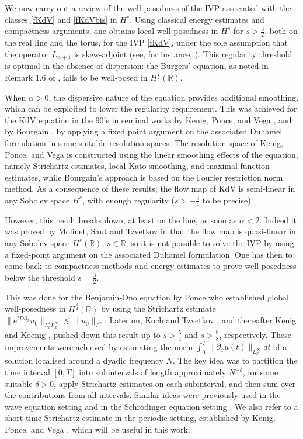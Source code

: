 \documentclass{amsart}
\theoremstyle{definition}
\theoremstyle{remark}
\numberwithin{equation}{section}
\begin{document}
We now carry out a review of the well-posedness of the IVP associated with the classes \eqref{fKdV} and \eqref{fKdVbis} in $H^s$. Using classical energy estimates and compactness arguments, one obtains local well-posedness in $H^s$ for $s > \frac{3}{2}$, both on the real line and the torus, for the IVP \eqref{fKdV}, under the sole assumption that the operator $L_{\alpha+1}$ is skew-adjoint (see, for instance, \cite{ABFS89}). This regularity threshold is optimal in the absence of dispersion: the Burgers' equation, as noted in Remark 1.6 of \cite{LiPiSa14}, fails to be well-posed in $H^{\frac32}(\mathbb R)$. 

When $\alpha > 0$, the dispersive nature of the equation provides additional smoothing, which can be exploited to lower the regularity requirement. This was achieved for the KdV equation in the 90's in seminal works by Kenig, Ponce, and Vega \cite{KPV93,KPV96}, and by Bourgain \cite{Bo93}, by applying a fixed point argument on the associated Duhamel formulation in some suitable resolution spaces. The resolution space of Kenig, Ponce, and Vega is constructed using the linear smoothing effects of the equation, namely Strichartz estimates, local Kato smoothing, and maximal function estimates, while Bourgain's approach is based on the Fourier restriction norm method. As a consequence of these results, the flow map of KdV is semi-linear in any Sobolev space $H^s$, with enough regularity ($s>-\frac34$ to be precise). 

However, this result breaks down, at least on the line, as soon as $\alpha<2$. Indeed it was proved by Molinet, Saut and Tzvetkov in \cite{MoSaTz01} that the flow map is quasi-linear in any Sobolev space $H^s(\mathbb R)$, $s\in \mathbb R$, so it is not possible to solve the IVP by using a fixed-point argument on the associated Duhamel formulation. One has then to come back to compactness methods and energy estimates to prove well-posedness below the threshold $s=\frac32$.

This was done for the Benjamin-Ono equation by Ponce \cite{Po91} who established global well-posedness in $H^\frac32(\mathbb R)$ by using the Strichartz estimate $\|e^{tD\partial_x}u_0\|_{L^4_tL^{\infty}_x} \lesssim \|u_0\|_{L^2}$. Later on, Koch and Tzvetkov \cite{KoTz03}, and thereafter Kenig and Koenig \cite{KK03}, pushed down this result up to $s>\frac54$ and $s>\frac98$, respectively. These improvements were achieved by estimating the norm $\int_0^T\|\partial_xu(t)\|_{L^{\infty}_x}dt $ of a solution  localised around a dyadic frequency $N$.  The key idea was to partition the time interval $[0, T]$ into subintervals of length approximately $N^{-\delta}$, for some suitable $\delta > 0$, apply Strichartz estimates on each subinterval, and then sum over the contributions from all intervals. Similar ideas were previously used  in the wave equation setting \cite{BC99,Ta00} and in the Schr\"odinger equation setting \cite{BGT04}. We also refer to a short-time Strichartz estimate in the periodic setting, established by Kenig, Ponce, and Vega \cite{KPV}, which will be useful in this work. 
\end{document}
